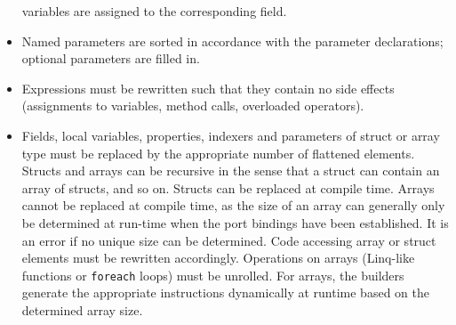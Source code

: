 \documentclass[a4paper,10pt,english]{article}
\begin{document}
\begin{itemize}
	variables are assigned to the corresponding field.
	\item Named parameters are sorted in accordance with the parameter declarations; optional parameters are filled in.
	\item Expressions must be rewritten such that they contain no side effects (assignments to variables, method calls, overloaded
	operators).
	\item Fields, local variables, properties, indexers and parameters of struct or array type must be replaced by the appropriate
	number of flattened elements. Structs and arrays can be recursive in the sense that a struct can contain an array of structs,
	and so on. Structs can be replaced at compile time. Arrays cannot be replaced at compile time, as the size of an array can
	generally only be determined at run-time when the port bindings have been established. It is an error if no unique size can be
	determined. Code accessing array or struct elements must be rewritten accordingly. Operations on arrays (Linq-like functions or
	\texttt{foreach} loops) must be unrolled. For arrays, the builders generate the appropriate instructions dynamically at runtime
	based on the determined array size.
\end{itemize}
\end{document}
